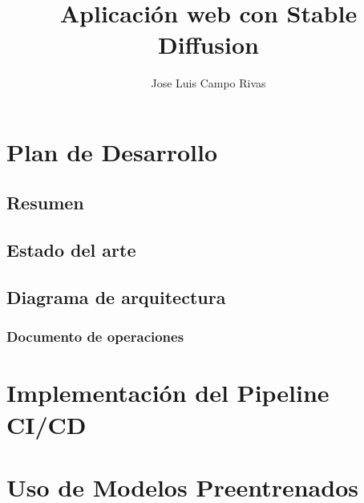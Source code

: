 \documentclass{article}
\title{Aplicación web con Stable Diffusion}
\author{Jose Luis Campo Rivas}
\date{\vspace{-2ex}}
\begin{document}
\maketitle

\section{Plan de Desarrollo}

\subsection{Resumen}

\subsection{Estado del arte}

\subsection{Diagrama de arquitectura}

\subsubsection{Documento de operaciones}


\section{Implementación del Pipeline CI/CD}


\section{Uso de Modelos Preentrenados}
\end{document}
